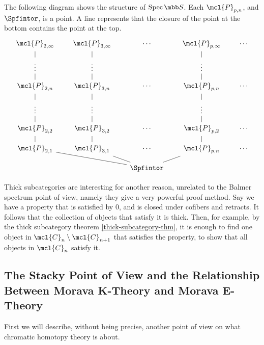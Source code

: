\begin{remark}
	The following diagram shows the structure of $\spec \SS$.
	Each $\mcl{P}_{p,n}$, and $\Spfintor$, is a point.
	A line represents that the closure of the point at the bottom contains the point at the top.
	$$
		\begin{tikzcd}[row sep=small, column sep=scriptsize]	
		\mcl{P}_{2, \infty} & \mcl{P}_{3, \infty} & \cdots & \mcl{P}_{p, \infty} & \cdots\\
		\vdots \arrow[dash]{u}{} & \vdots \arrow[dash]{u}{} &  & \vdots \arrow[dash]{u}{} & \\
		\mcl{P}_{2, n} \arrow[dash]{u}{} & \mcl{P}_{3, n} \arrow[dash]{u}{} & \cdots & \mcl{P}_{p, n} \arrow[dash]{u}{} & \cdots\\
		\vdots \arrow[dash]{u}{} & \vdots \arrow[dash]{u}{} &  & \vdots \arrow[dash]{u}{} & \\
		\mcl{P}_{2, 2} \arrow[dash]{u}{} & \mcl{P}_{3, 2} \arrow[dash]{u}{} & \cdots & \mcl{P}_{p, 2} \arrow[dash]{u}{} & \cdots\\
		\mcl{P}_{2, 1} \arrow[dash]{u}{} & \mcl{P}_{3, 1} \arrow[dash]{u}{} & \cdots & \mcl{P}_{p, n} \arrow[dash]{u}{} & \cdots\\
		& & \Spfintor \arrow[dash]{ull}{} \arrow[dash]{ul}{} \arrow[dash]{ur}{}
	\end{tikzcd}
	$$
\end{remark}

\begin{remark}
	Thick subcategories are interesting for another reason, unrelated to the Balmer spectrum point of view, namely they give a very powerful proof method.
	Say we have a property that is satisfied by $0$, and is closed under cofibers and retracts.
	It follows that the collection of objects that satisfy it is thick.
	Then, for example, by the thick subcategory theorem \ref{thick-subcategory-thm}, it is enough to find one object in $\mcl{C}_n \setminus \mcl{C}_{n+1}$ that satisfies the property, to show that all objects in $\mcl{C}_n$ satisfy it.
\end{remark}



\subsection{The Stacky Point of View and the Relationship Between Morava K-Theory and Morava E-Theory}

First we will describe, without being precise, another point of view on what chromatic homotopy theory is about.

